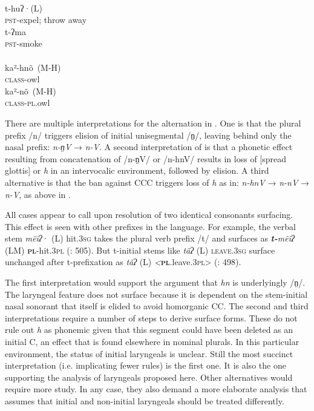 \documentclass[output=paper]{langscibook}
\begin{document}
\ea\label{ex:dobui:21}
\ea\label{ex:dobui:21a}
{\label{bkm:Ref124497611}\citet[476, 491]{DeJesúsGarcía2004}}\\
\gll t-huʔ·(L)\\
     \textsc{pst}-expel; throw away\\
\gll t-ʔma\\
     \textsc{pst}-smoke\\

\ex\label{ex:dobui:21b}
{\label{bkm:Ref124497613}\citet[6]{Bauernschmidt2010}}\\
ka²-hnõ~(M-H)\\
     \textsc{class}-owl\\

ka²-nõ~(M-H)\\
     \textsc{class}-\textsc{pl}.owl\\
\z
\z

There are multiple interpretations for the alternation in . One is that the plural prefix /n/ triggers elision of initial unisegmental /n̤/, leaving behind only the nasal prefix: \textit{n-n̤V} → \textit{n-V}. A second interpretation of  is that a phonetic effect resulting from concatenation of /n-n̤V/ or /n-hnV/ results in loss of [spread glottis] or \textit{h} in an intervocalic environment, followed by elision. A third alternative is that the ban against CCC triggers loss of \textit{h} as in: \textit{n-hnV} → \textit{n-nV} → \textit{n-V}, as above in .

All cases appear to call upon resolution of two identical consonants surfacing. This effect is seen with other prefixes in the language. For example, the verbal stem \textit{mẽĩʔ}{{·}} (L) hit.3\textsc{sg} takes the plural verb prefix /t/ and surfaces as \textbf{\textit{t-}}\textit{mẽĩʔ} (LM) \textbf{\textsc{pl}}\textsc{-}hit.3\textsc{pl} (\citealt{DeJesúsGarcía2004}: 505). But t-initial stems like \textit{tãʔ} (L) \textsc{leave.3}\textsc{sg} surface unchanged after t-prefixation as \textit{t}\textit{ãʔ} (L) \textit{<}\textbf{\textsc{pl}}.leave.3\textsc{pl>} (\citealt{DeJesúsGarcía2004}: 498).

The first interpretation would support the argument that \textit{hn} is underlyingly \mbox{/n̤/}. The laryngeal feature does not surface because it is dependent on the stem-initial nasal sonorant that itself is elided to avoid homorganic CC. The second and third interpretations require a number of steps to derive surface forms. These do not rule out \textit{h} as phonemic given that this segment could have been deleted as an initial C, an effect that is found elsewhere in nominal plurals. In this particular environment, the status of initial laryngeals is unclear. Still the most succinct interpretation (i.e. implicating fewer rules) is the first one. It is also the one supporting the analysis of laryngeals proposed here. Other alternatives would require more study. In any case, they also demand a more elaborate analysis that assumes that initial and non-initial laryngeals should be treated differently. 
\end{document}
